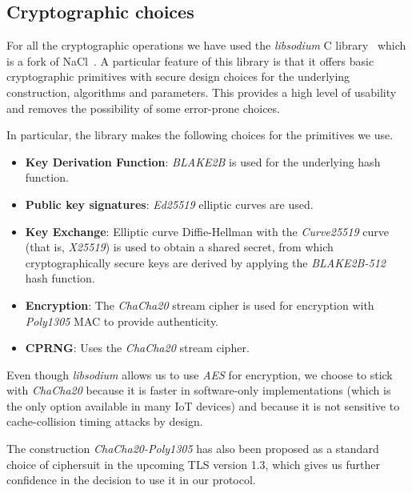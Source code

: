 
\subsection{Cryptographic choices}

For all the cryptographic operations we have used the \emph{libsodium} C
library~\cite{libsodium} which is a fork of NaCl~\cite{nacl}.  A particular
feature of this library is that it offers basic cryptographic primitives with
secure design choices for the underlying construction, algorithms and
parameters.  This provides a high level of usability and removes the
possibility of some error-prone choices.

In particular, the library makes the following choices for the primitives we use.

\begin{itemize}
  \item \textbf{Key Derivation Function}: \emph{BLAKE2B} is used for the
    underlying hash function.
  \item \textbf{Public key signatures}: \emph{Ed25519} elliptic curves are used.
  \item \textbf{Key Exchange}: Elliptic curve Diffie-Hellman with the
    \emph{Curve25519} curve (that is, \emph{X25519}) is used to obtain a shared
    secret, from which cryptographically secure keys are derived by applying
    the \emph{BLAKE2B-512} hash function.
  \item \textbf{Encryption}: The \emph{ChaCha20} stream cipher is used for
    encryption with \emph{Poly1305} MAC to provide authenticity.
  \item \textbf{CPRNG}: Uses the \emph{ChaCha20} stream cipher.
\end{itemize}

Even though \emph{libsodium} allows us to use \emph{AES} for encryption, we
choose to stick with \emph{ChaCha20} because it is faster in software-only
implementations (which is the only option available in many IoT devices) and
because it is not sensitive to cache-collision timing attacks by design.

The construction \emph{ChaCha20-Poly1305} has also been proposed as a standard
choice of ciphersuit in the upcoming TLS version 1.3, which gives us further
confidence in the decision to use it in our protocol.
